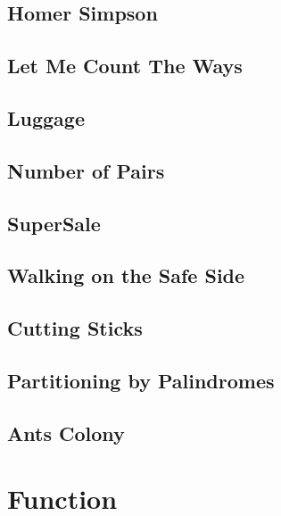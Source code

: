        \subsection{Homer Simpson}
                
        \subsection{Let Me Count The Ways}
                
        \subsection{Luggage}
                
        \subsection{Number of Pairs}
                
        \subsection{SuperSale}
                
        \subsection{Walking on the Safe Side}
                
        \subsection{Cutting Sticks}
                
        \subsection{Partitioning by Palindromes}
                
        \subsection{Ants Colony}
                

\section{Function}
